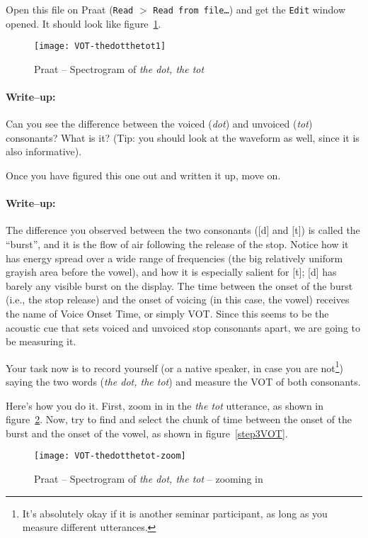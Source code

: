 \documentclass{article}
\newcommand{\soft}[1]{\textsf{#1}}
\newcommand{\softmenu}[1]{\texttt{#1}}
\newcommand{\Praat}{\soft{Praat}}
\begin{document}
Open this file on \Praat{} (\softmenu{Read} $>$ \softmenu{Read from file\ldots}) and get the \softmenu{Edit} window opened. It should look like figure~\ref{step1VOT}.

\begin{figure}[!tbp]
\caption{\Praat{} -- Spectrogram of \emph{the dot, the tot}}
\label{step1VOT}
	\begin{center}
		\texttt{[image: VOT-thedotthetot1]}
	\end{center}
\end{figure}

\paragraph{Write--up:} Can you see the difference between the voiced (\emph{dot}) and unvoiced (\emph{tot}) consonants? What is it? (Tip: you should look at the waveform as well, since it is also informative).

Once you have figured this one out and written it up, move on.

\paragraph{Write--up:} The difference you observed between the two consonants ([d] and [t]) is called the ``burst'', and it is the flow of air following the release of the stop. Notice how it has energy spread over a wide range of frequencies (the big relatively uniform grayish area before the vowel), and how it is especially salient for [t]; [d] has barely any visible burst on the display. The time between the onset of the burst (i.e., the stop release) and the onset of voicing (in this case, the vowel) receives the name of Voice Onset Time, or simply VOT. Since this seems to be the acoustic cue that sets voiced and unvoiced stop consonants apart, we are going to be measuring it.

Your task now is to record yourself (or a native speaker, in case you are not\footnote{It's absolutely okay if it is another seminar participant, as long as you measure different utterances.}) saying the two words (\emph{the dot, the tot}) and measure the VOT of both consonants.

Here's how you do it. First, zoom in in the \emph{the tot} utterance, as shown in figure~\ref{step2VOT}. Now, try to find and select the chunk of time between the onset of the burst and the onset of the vowel, as shown in figure~\ref{step3VOT}. 
\begin{figure}[!tbp]
\caption{\Praat{} -- Spectrogram of \emph{the dot, the tot} -- zooming in}
\label{step2VOT}
	\begin{center}
		\texttt{[image: VOT-thedotthetot-zoom]}
	\end{center}
\end{figure}
\end{document}

